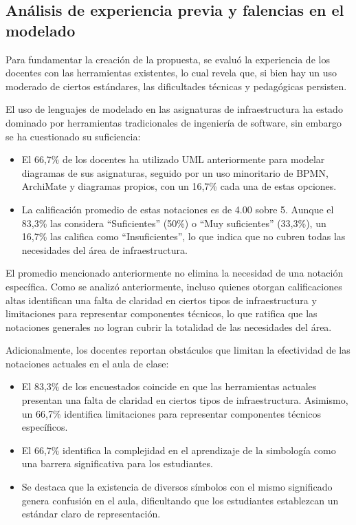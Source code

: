 \subsection{Análisis de experiencia previa y falencias en el modelado}

Para fundamentar la creación de la propuesta, se evaluó la experiencia de los docentes con las herramientas existentes, lo cual revela que, si bien hay un uso moderado de ciertos estándares, las dificultades técnicas y pedagógicas persisten.

El uso de lenguajes de modelado en las asignaturas de infraestructura ha estado dominado por herramientas tradicionales de ingeniería de software, sin embargo se ha cuestionado su suficiencia:



\begin{itemize}
	\item El 66,7\% de los docentes ha utilizado UML anteriormente para modelar diagramas de sus asignaturas, seguido por un uso minoritario de BPMN, ArchiMate y diagramas propios, con un 16,7\% cada una de estas opciones.
	\item La calificación promedio de estas notaciones es de 4.00 sobre 5. Aunque el 83,3\% las considera ``Suficientes'' (50\%) o ``Muy suficientes'' (33,3\%), un 16,7\% las califica como ``Insuficientes'', lo que indica que no cubren todas las necesidades del área de infraestructura.
\end{itemize}

El promedio mencionado anteriormente no elimina la necesidad de una notación específica. Como se analizó anteriormente, incluso quienes otorgan calificaciones altas identifican una falta de claridad en ciertos tipos de infraestructura y limitaciones para representar componentes técnicos, lo que ratifica que las notaciones generales no logran cubrir la totalidad de las necesidades del área.

Adicionalmente, los docentes reportan obstáculos que limitan la efectividad de las notaciones actuales en el aula de clase:


\begin{itemize}
	\item El 83,3\% de los encuestados coincide en que las herramientas actuales presentan una falta de claridad en ciertos tipos de infraestructura. Asimismo, un 66,7\% identifica limitaciones para representar componentes técnicos específicos.
	\item El 66,7\% identifica la complejidad en el aprendizaje de la simbología como una barrera significativa para los estudiantes.
	\item Se destaca que la existencia de diversos símbolos con el mismo significado genera confusión en el aula, dificultando que los estudiantes establezcan un estándar claro de representación.
\end{itemize}

